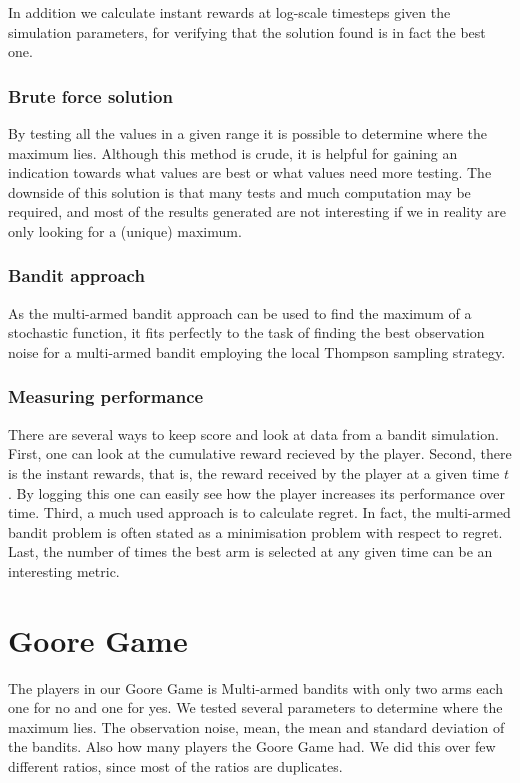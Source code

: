 In addition we calculate instant rewards at log-scale timesteps given the simulation parameters, for verifying that the solution found is in fact the best one.

\subsubsection{Brute force solution}

By testing all the values in a given range it is possible to determine where the maximum lies.
Although this method is crude, it is helpful for gaining an indication towards what values are best or what values need more testing.
The downside of this solution is that many tests and much computation may be required, and most of the results generated are not interesting if we in reality are only looking for a (unique) maximum.

\subsubsection{Bandit approach}

As the multi-armed bandit approach can be used to find the maximum of a
stochastic function, it fits perfectly to the task of finding the best
observation noise for a multi-armed bandit employing the local Thompson
sampling strategy.

\subsubsection{Measuring performance}

There are several ways to keep score and look at data from a bandit simulation.
First, one can look at the cumulative reward recieved by the player.
Second, there is the instant rewards, that is, the reward received by the player at a given time $t$.
By logging this one can easily see how the player increases its performance over time.
Third, a much used approach is to calculate regret.
In fact, the multi-armed bandit problem is often stated as a minimisation problem with respect to regret.
Last, the number of times the best arm is selected at any given time can be an interesting metric.


\section{Goore Game}
The players in our Goore Game is Multi-armed bandits with only two arms each one for no and one for yes.
We tested several parameters to determine where the maximum lies. The observation noise, mean, the mean
and standard deviation of the bandits. Also how many players the Goore Game had. We did this over few different
ratios, since most of the ratios are duplicates. 


